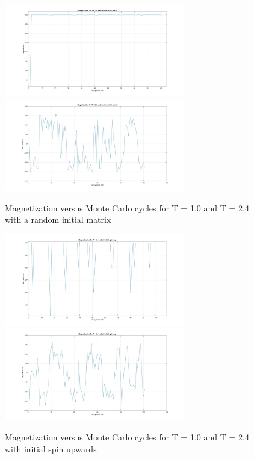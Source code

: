 \documentclass[10pt,a4paper]{article}
\begin{document}
\begin{figure}[H]
\centering
\includegraphics[width=0.7\textwidth]{magnetizationT1random}
\includegraphics[width=0.7\textwidth]{magnetizationT24random}
\caption{Magnetization versus Monte Carlo cycles for T = 1.0 and T = 2.4 with a random initial matrix}
\label{fig:magneticrandom}
\end{figure}

\begin{figure}[H]
\centering
\includegraphics[width=0.7\textwidth]{magnetizationT1upspin}
\includegraphics[width=0.7\textwidth]{magnetizationT24upspin}
\caption{Magnetization versus Monte Carlo cycles for T = 1.0 and T = 2.4 with initial spin upwards}
\label{fig:magneticupspin}
\end{figure}
\end{document}
